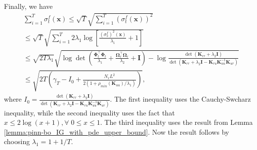     Finally, we have
    \begin{align*}
        &\sum_{i=1}^T \sigma_t^f(\mathbf{x})  \le \sqrt{T} \sqrt{ \sum_{i=1}^T \left(\sigma_t^f(\mathbf{x})\right)^2}
        \\
        & \le \sqrt{T} \sqrt{\sum_{i=1}^T 2\lambda_1\log \left[\frac{\left(\sigma_s^f\right)^2(\mathbf{x})}{\lambda_1} +1 \right]} 
        \\
        & \le \sqrt{2T\lambda_1} \sqrt{\log \det(\frac{\boldsymbol{\Phi}_t^\top \boldsymbol{\Phi}_t}{\lambda_1} + \frac{\boldsymbol{\Omega}_r^\top \boldsymbol{\Omega}_r}{\lambda_2} + \mathbf{I}) - \log \frac{\det (\mathbf{K}_{rr} + \lambda_2\mathbf{I})}{\det(\mathbf{K}_{rr} + \lambda_2 \mathbf{I} -  \mathbf{K}_{ru} \mathbf{K}_{uu}^{-1} \mathbf{K}_{ur})}}
        \\
        & \le \sqrt{2T\left(\gamma_T - I_0 + \frac{N_r L^2}{2(1+ \rho_{min}(\mathbf{K}_{uu})/\lambda_1)}\right)},
    \end{align*}
    where $I_0= \frac{\det (\mathbf{K}_{rr} + \lambda_2\mathbf{I})}{\det(\mathbf{K}_{rr} + \lambda_2 \mathbf{I} -  \mathbf{K}_{ru} \mathbf{K}_{uu}^{-1} \mathbf{K}_{ur})}$. 
    The first inequality uses the Cauchy-Swcharz inequality, while the second inequality uses the fact that $x \le 2\log(x+1), \forall \; 0 \le x \le 1$. The third inequality uses the result from Lemma \ref{lemma:pinn-bo_IG_with_pde_upper_bound}. Now the result follows by choosing $\lambda_1 = 1 + 1/T$.

